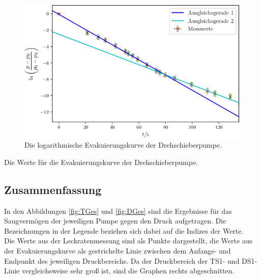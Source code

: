 \begin{figure}
\centering
\includegraphics[width=\linewidth-70pt,height=\textheight-70pt,keepaspectratio]{content/images/DSL.png}
\caption{Die logarithmische Evakuierungskurve der Drehschieberpumpe.}
\label{fig:DSL}
\end{figure}

\begin{table}
\centering
\caption{Die Werte für die Evakuierungskurve der Drehschieberpumpe.}

\label{tab:DS}
\end{table}

\subsection{Zusammenfassung} 

In den Abbildungen \ref{fig:TGes} und \ref{fig:DGes} sind die Ergebnisse für das Saugvermögen der jeweiligen Pumpe gegen den Druck aufgetragen. Die Bezeichnungen in der Legende beziehen sich dabei auf die Indizes der Werte.\\
Die Werte aus der Leckratenmessung sind als Punkte dargestellt, die Werte aus der Evakuierungskurve als gestrichelte Linie zwischen dem Anfangs- und Endpunkt des jeweiligen Druckbereichs. Da der Druckbereich der TS1- und DS1-Linie vergleichsweise sehr groß ist, sind die Graphen rechts abgeschnitten. 

